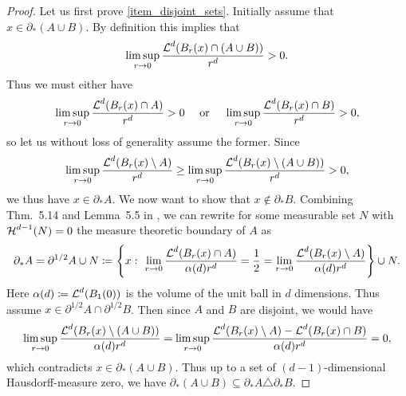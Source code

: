 \begin{proof}
	Let us first prove \cref{item_disjoint_sets}. Initially assume that $ x \in \partial_{ \ast } ( A \cup B ) $. By definition this implies that
	\begin{equation*}
		\limsup_{ r \to 0 }
		\frac{ \operatorname{\mathcal{L}}^{ d } ( B_{ r } ( x ) \cap ( A \cup B ) ) }{ r^{ d } }
		>0.
	\end{equation*}
	Thus we must either have
	\begin{equation*}
		\limsup_{ r \to 0 }
		\frac{ \operatorname{\mathcal{L}}^{ d } ( B_{ r } ( x ) \cap A ) }{ r^{ d } }
		>0
		\quad 
		\text{ or }
		\quad
		\limsup_{ r \to 0 }
		\frac{ \operatorname{\mathcal{L}}^{ d } ( B_{ r } ( x ) \cap  B ) }{ r^{ d } }
		>0,
	\end{equation*}
	so let us without loss of generality assume the former. Since
	\begin{equation*}
		\limsup_{ r \to 0 }
		\frac{ \operatorname{\mathcal{L}}^{ d } ( B_{ r } ( x ) \setminus A ) }{ r^{ d } }
		\geq
		\limsup_{ r \to 0 }
		\frac{ \operatorname{\mathcal{L}}^{ d } ( B_{ r } ( x ) \setminus ( A \cup B ) ) }{ r^{ d } }
		>0,
	\end{equation*}
	we thus have $ x \in \partial_{ \ast } A $.
	We now want to show that $ x \notin \partial_{ \ast } B $.
	Combining Thm.~5.14 and Lemma~5.5 in \cite{evans_gariepy_measure_theory_and_fine_props}, we can rewrite for some measurable set $ N $ with $ \operatorname{\mathcal{H}}^{ d- 1 } ( N ) = 0 $ the measure theoretic boundary of $ A $ as
	\begin{equation}
		\label{measure_theoretic_boundary_almost_half_boundary}
		\partial_{ \ast } A 
		=
		\partial^{ 1/2 } A \cup N 
		\coloneqq
		\left\{
		x 
		\, \colon \,
		\lim_{ r \to 0 }
		\frac{ \operatorname{\mathcal{L}}^{ d } ( B_{ r } ( x ) \cap A ) }{ \alpha( d ) r^{ d } }
		=
		\frac{ 1 }{ 2 }
		=
		\lim_{ r \to 0 }
		\frac{ \operatorname{\mathcal{L}}^{ d } ( B_{ r } ( x ) \setminus A ) }{ \alpha( d ) r^{ d } }
		\right\}
		\cup N.
	\end{equation}
	Here $ \alpha ( d ) \coloneqq \operatorname{\mathcal{L}}^{ d } ( B_{ 1 } ( 0 ) ) $ is the volume 
	of the unit ball in $ d $ dimensions.
	Thus assume $ x \in \partial^{ 1/2 } A \cap \partial^{ 1/2 } B $. Then since $ A $ and $ B $ are disjoint, we would have
	\begin{equation*}
		\limsup_{ r \to 0 }
		\frac{ \operatorname{\mathcal{L}}^{ d } ( B_{ r } ( x ) \setminus  ( A \cup B ) ) }{ \alpha( d 
		) r^{ d } }
		=
		\limsup_{ r \to 0 }
		\frac{ \operatorname{\mathcal{L}}^{ d } ( B_{ r } ( x ) \setminus A ) - \operatorname{\mathcal{L}}^{ d } ( B_{ r } ( x ) \cap B ) }{ \alpha( d ) r^{ d } }
		=
		0,
	\end{equation*}
	which contradicts $ x \in \partial_{ \ast } ( A \cup B ) $. Thus up to a set of $(d-1)$-dimensional Hausdorff-measure zero, we have 
	$ \partial_{ \ast } ( A \cup B ) \subseteq \partial_{ \ast } A \triangle \partial_{ \ast } B $.
	

\end{proof}
